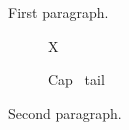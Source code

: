 \documentclass{article}
\begin{document}
First paragraph.

\begin{figure}[h] \centering X \caption{Cap \lxmbf\ tail} \end{figure}

Second paragraph.
\end{document}

